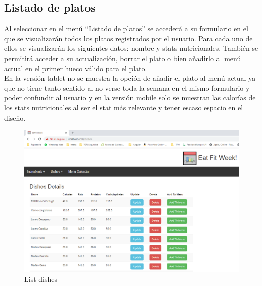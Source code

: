 \documentclass[12pt, a4paper, twoside]{book}
\begin{document}
	\subsection{Listado de platos}
	Al seleccionar en el menú ``Listado de platos'' se accederá a su formulario en el que se visualizarán todos los platos registrados por el usuario. Para cada uno de ellos se visualizarán los siguientes datos: nombre y stats nutricionales. También se permitirá acceder a su actualización, borrar el plato o bien añadirlo al menú actual en el primer hueco válido para el plato.\\
	En la versión tablet no se muestra la opción de añadir el plato al menú actual ya que no tiene tanto sentido al no verse toda la semana en el mismo formulario y poder confundir al usuario y en la versión mobile solo se muestran las calorías de los stats nutricionales al ser el stat más relevante y tener escaso espacio en el diseño.
	\begin{figure}[H]
		\centering
		\includegraphics[width=15cm]{Imagenes/MU-ListDishes.png}
		\caption{List dishes}\label{List dishes}
	\end{figure}
\end{document}
